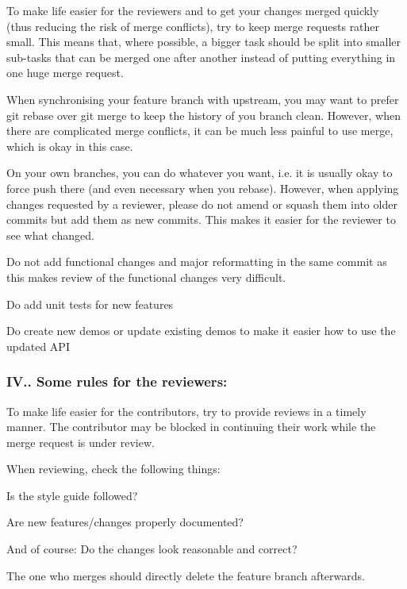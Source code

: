 \begin{DoxyItemize}
\item To make life easier for the reviewers and to get your changes merged quickly (thus reducing the risk of merge conflicts), try to keep merge requests rather small. This means that, where possible, a bigger task should be split into smaller sub-\/tasks that can be merged one after another instead of putting everything in one huge merge request.
\item When synchronising your feature branch with upstream, you may want to prefer git rebase over git merge to keep the history of you branch clean. However, when there are complicated merge conflicts, it can be much less painful to use merge, which is okay in this case.
\item On your own branches, you can do whatever you want, i.\+e. it is usually okay to force push there (and even necessary when you rebase). However, when applying changes requested by a reviewer, please do not amend or squash them into older commits but add them as new commits. This makes it easier for the reviewer to see what changed.
\item Do not add functional changes and major reformatting in the same commit as this makes review of the functional changes very difficult.
\item Do add unit tests for new features
\item Do create new demos or update existing demos to make it easier how to use the updated A\+PI
\end{DoxyItemize}

\subsubsection*{I\+V.. Some rules for the reviewers\+:}


\begin{DoxyItemize}
\item To make life easier for the contributors, try to provide reviews in a timely manner. The contributor may be blocked in continuing their work while the merge request is under review.
\item When reviewing, check the following things\+:
\begin{DoxyItemize}
\item Is the style guide followed?
\item Are new features/changes properly documented?
\item And of course\+: Do the changes look reasonable and correct?
\end{DoxyItemize}
\item The one who merges should directly delete the feature branch afterwards.
\end{DoxyItemize}

